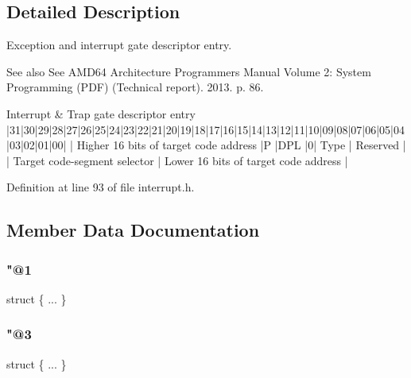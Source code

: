 \subsection{Detailed Description}
Exception and interrupt gate descriptor entry. 

\begin{DoxySeeAlso}{See also}
See A\+M\+D64 Architecture Programmer\textquotesingle{}s Manual Volume 2\+: System Programming (P\+DF) (Technical report). 2013. p. 86.
\end{DoxySeeAlso}
\begin{DoxyVerb}Interrupt & Trap gate descriptor entry
|31|30|29|28|27|26|25|24|23|22|21|20|19|18|17|16|15|14|13|12|11|10|09|08|07|06|05|04|03|02|01|00|
| Higher 16 bits of target code address         |P |DPL  |0|    Type    | Reserved              |
| Target code-segment selector                  | Lower 16 bits of target code address          |
\end{DoxyVerb}
 

Definition at line 93 of file interrupt.\+h.



\subsection{Member Data Documentation}
\mbox{\label{union_i_n_t_r_p_1_1_descriptor_entry_aca00412988ec1cd09124f03da2bb1f62}} 
\subsubsection{\texorpdfstring{"@1}{@1}}
{\footnotesize\ttfamily struct \{ ... \} }

\mbox{\label{union_i_n_t_r_p_1_1_descriptor_entry_a2aee92276b93731d9ccafa7eb16c9c2e}} 
\subsubsection{\texorpdfstring{"@3}{@3}}
{\footnotesize\ttfamily struct \{ ... \} }

\mbox{\label{union_i_n_t_r_p_1_1_descriptor_entry_a479e62ef6f3e27e03e121d965d6bab99}} 
